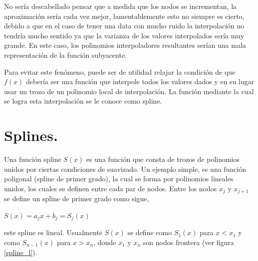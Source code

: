 \hspace{0.4cm} No ser\'ia descabellado pensar que a medida que los nodos se incrementan, la aproximaci\'on ser\'ia cada vez mejor, lamentablemente esto no siempre es cierto, debido a que en el caso de tener una data con mucho ruido la interpolaci\'on no tendr\'ia mucho sentido ya que la varianza de los valores interpolados ser\'ia muy grande. En este caso, los polinomios interpoladores resultantes ser\'ian una mala representaci\'on de la funci\'on subyacente.

\vspace{0.5cm}

\hspace{0.4cm} Para evitar este fen\'omeno, puede ser de utilidad relajar la condici\'on de que $f(x)$ deber\'ia ser una funci\'on que interpole todos los valores dados y en su lugar usar un trozo de un polinomio local de interpolaci\'on. La funci\'on mediante la cual se logra esta interpolaci\'on se le conoce como spline.


\section{Splines.}

\vspace{1 cm}

\hspace{0.4cm} Una funci\'on spline $S(x)$ es una funci\'on que consta de trozos de polinomios unidos por ciertas condiciones de suavizado. Un ejemplo simple, es una funci\'on poligonal (spline de primer grado), la cual se forma por polinomios lineales unidos, los cuales se definen entre cada par de nodos. Entre los nodos $x_{j}$ y $x_{j+1}$ se define un spline de primer grado como sigue, \\

\begin{center}

$\displaystyle{S(x) = a_{j}x + b_{j} = S_{j}(x)}$

\end{center}

\vspace{0.5cm}

\noindent este spline es lineal. Usualmente $S(x)$ se define como $S_{1}(x)$ para $x<x_{1}$ y como $S_{n-1}(x)$ para $x>x_{n}$, donde $x_{1}$ y $x_{n}$ son nodos frontera (ver figura \ref{spline_l}).



